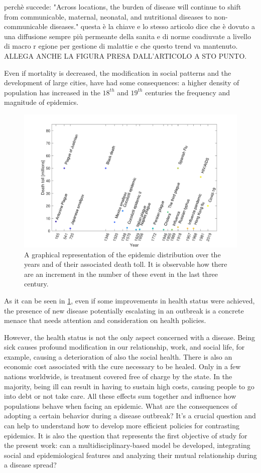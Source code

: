perchè succede:
"Across locations, the burden of disease will continue to shift from communicable, maternal, neonatal, and nutritional
diseases to non-communicable diseases." 
questa è la chiave e lo stesso articolo dice che  è dovuto a una diffusione sempre più permeante della sanita e di norme coadiuvate a livello di macro r egione per gestione di malattie e che questo trend va mantenuto. 
ALLEGA ANCHE LA FIGURA PRESA DALL'ARTICOLO A STO PUNTO. 

 Even if mortality is decreased, the modification in social patterns and the development of large cities, have had some consequences: a higher density of population has increased in the $18^{th}$ and $19^{th}$ centuries the frequency and magnitude of epidemics.
\begin{figure}[h]
	\centering
	\includegraphics[width=0.85\linewidth]{0_introduction/images_introduction/worst_epidemic}
	\caption[Epidemic distribution in time]{A graphical representation of the epidemic distribution over the years and of their associated death toll. It is observable how there are an increment in the number of these event in the last three century.}
	\label{fig:worstepidemic}
\end{figure}


  As it can be seen in \ref{fig:worstepidemic}, even if some improvements in health status were achieved, the presence of new disease potentially escalating in an outbreak is a concrete menace that needs attention and consideration on health policies. 

However, the health status is not the only aspect concerned with a disease. Being sick causes profound modification in our relationship, work, and social life, for example, causing a deterioration of also the social health. 
There is also an economic cost associated with the cure necessary to be healed. Only in a few nations worldwide, is treatment covered free of charge by the state. In the majority, being ill can result in having to sustain high costs, causing people to go into debt or not take care. 
All these effects sum together and influence how populations behave when facing an epidemic. What are the consequences of adopting a certain behavior during a disease outbreak? It's a crucial question and can help to understand how to develop more efficient policies for contrasting epidemics. It is also the question that represents the first objective of study for the present work: can a multidisciplinary-based model be developed, integrating social and epidemiological features and analyzing their mutual relationship during a disease spread? 

